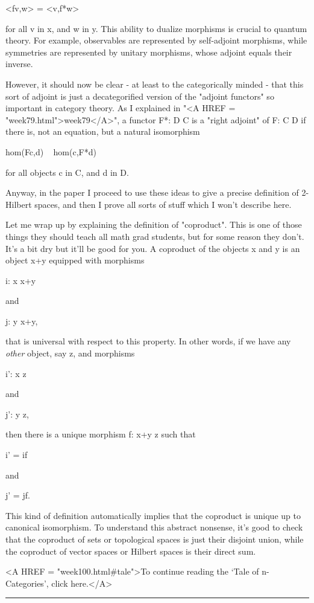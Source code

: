 <fv,w> = <v,f*w> 

for all v in x, and w in y.  This ability to dualize morphisms is
crucial to quantum theory.  For example, observables are represented
by self-adjoint morphisms, while symmetries are represented by unitary
morphisms, whose adjoint equals their inverse.

However, it should now be clear - at least to the categorically minded -
that this sort of adjoint is just a decategorified version of the
"adjoint functors" so important in category theory.  As I explained in
"<A HREF = "week79.html">week79</A>", a functor F*: D \to  C is a "right adjoint" of F: C \to  D if
there is, not an equation, but a natural isomorphism

hom(Fc,d) ~ hom(c,F*d) 

for all objects c in C, and d in D.  

Anyway, in the paper I proceed to use these ideas to give a precise
definition of 2-Hilbert spaces, and then I prove all sorts of stuff
which I won't describe here.

Let me wrap up by explaining the definition of "coproduct".  This is
one of those things they should teach all math grad students, but for
some reason they don't.  It's a bit dry but it'll be good for you.  A
coproduct of the objects x and y is an object x+y equipped with
morphisms

i: x \to  x+y  

and 

j: y \to  x+y,

that is universal with respect to this property.  In other words,
if we have any \emph{other} object, say z, and morphisms

i': x \to  z

and 

j': y \to  z,

then there is a unique morphism f: x+y \to  z such that 

i' = if  

and

j' = jf.

This kind of definition automatically implies that the coproduct is
unique up to canonical isomorphism.  To understand this abstract
nonsense, it's good to check that the coproduct of sets or topological
spaces is just their disjoint union, while the coproduct of vector
spaces or Hilbert spaces is their direct sum.


<A HREF = "week100.html#tale">To continue reading the `Tale of
n-Categories', click here.</A>


\par\noindent\rule{\textwidth}{0.4pt}

